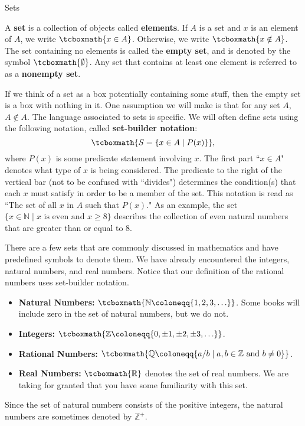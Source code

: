 \begin{section}{Sets}

\begin{definition}
A \textbf{set} is a collection of objects called \textbf{elements}. If $A$ is a set and $x$ is an element of $A$, we write $\tcboxmath{x\in A}$. Otherwise, we write $\tcboxmath{x\notin A}$. The set containing no elements is called the \textbf{empty set}, and is denoted by the symbol $\tcboxmath{\emptyset}$. Any set that contains at least one element is referred to as a \textbf{nonempty set}.
\end{definition}

If we think of a set as a box potentially containing some stuff, then the empty set is a box with nothing in it. One assumption we will make is that for any set $A$, $A\notin A$. The language associated to sets is specific.  We will often define sets using the following notation, called \textbf{set-builder notation}:
\[
\tcboxmath{S=\{x \in A\mid P(x)\}},
\]
where $P(x)$ is some predicate statement involving $x$. The first part ``$x \in A$" denotes what type of $x$ is being considered.  The predicate to the right of the vertical bar (not to be confused with ``divides") determines the condition(s) that each $x$ must satisfy in order to be a member of the set.  This notation is read as ``The set of all $x$ in $A$ such that $P(x)$." As an example, the set $\{x\in \mathbb{N}\mid x \mbox{ is even and }x\geq 8\}$ describes the collection of even natural numbers that are greater than or equal to 8.

There are a few sets that are commonly discussed in mathematics and have predefined symbols to denote them. We have already encountered the integers, natural numbers, and real numbers. Notice that our definition of the rational numbers uses set-builder notation.
\begin{itemize}
\item \textbf{Natural Numbers:} $\tcboxmath{\mathbb{N}\coloneqq \{1,2,3,\ldots\}}$. Some books will include zero in the set of natural numbers, but we do not.
\item \textbf{Integers:} $\tcboxmath{\mathbb{Z}\coloneqq \{0, \pm 1, \pm2, \pm 3, \ldots\}}$.
\item \textbf{Rational Numbers:} $\tcboxmath{\mathbb{Q}\coloneqq \{a/b \mid a, b \in \mathbb{Z} \text{ and } b \neq 0\}}$.
\item \textbf{Real Numbers:} $\tcboxmath{\mathbb{R}}$ denotes the set of real numbers. We are taking for granted that you have some familiarity with this set. 
\end{itemize}
Since the set of natural numbers consists of the positive integers, the natural numbers are sometimes denoted by $\mathbb{Z}^+$.


\end{section}
